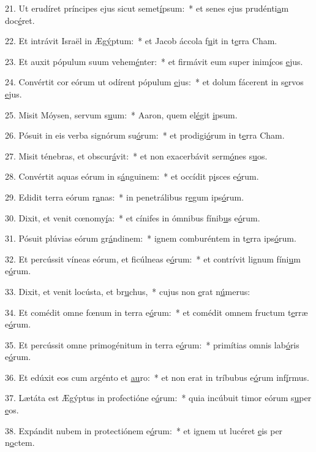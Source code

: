 21. Ut erudíret príncipes ejus sicut semet\uline{í}psum:~* et senes ejus prudénti\uline{a}m doc\uline{é}ret.\par 
22. Et intrávit Israël in Æg\uline{ý}ptum:~* et Jacob áccola f\uline{u}it in t\uline{e}rra Cham.\par 
23. Et auxit pópulum suum vehem\uline{é}nter:~* et firmávit eum super inim\uline{í}cos \uline{e}jus.\par 
24. Convértit cor eórum ut odírent pópulum \uline{e}jus:~* et dolum fácerent in s\uline{e}rvos \uline{e}jus.\par 
25. Misit Móysen, servum s\uline{u}um:~* Aaron, quem el\uline{é}git \uline{i}psum.\par 
26. Pósuit in eis verba signórum su\uline{ó}rum:~* et prodigi\uline{ó}rum in t\uline{e}rra Cham.\par 
27. Misit ténebras, et obscur\uline{á}vit:~* et non exacerbávit serm\uline{ó}nes s\uline{u}os.\par 
28. Convértit aquas eórum in s\uline{á}nguinem:~* et occídit p\uline{i}sces e\uline{ó}rum.\par 
29. Edidit terra eórum r\uline{a}nas:~* in penetrálibus r\uline{e}gum ips\uline{ó}rum.\par 
30. Dixit, et venit cœnomy\uline{í}a:~* et cínifes in ómnibus fínib\uline{u}s e\uline{ó}rum.\par 
31. Pósuit plúvias eórum gr\uline{á}ndinem:~* ignem comburéntem in t\uline{e}rra ips\uline{ó}rum.\par 
32. Et percússit víneas eórum, et ficúlneas e\uline{ó}rum:~* et contrívit lignum fíni\uline{u}m e\uline{ó}rum.\par 
33. Dixit, et venit locústa, et br\uline{u}chus,~* cujus non \uline{e}rat n\uline{ú}merus:\par 
34. Et comédit omne fœnum in terra e\uline{ó}rum:~* et comédit omnem fructum t\uline{e}rræ e\uline{ó}rum.\par 
35. Et percússit omne primogénitum in terra e\uline{ó}rum:~* primítias omnis lab\uline{ó}ris e\uline{ó}rum.\par 
36. Et edúxit eos cum argénto et \uline{au}ro:~* et non erat in tríbubus e\uline{ó}rum inf\uline{í}rmus.\par 
37. Lætáta est Ægýptus in profectióne e\uline{ó}rum:~* quia incúbuit timor eórum s\uline{u}per \uline{e}os.\par 
38. Expándit nubem in protectiónem e\uline{ó}rum:~* et ignem ut lucéret \uline{e}is per n\uline{o}ctem.\par 

